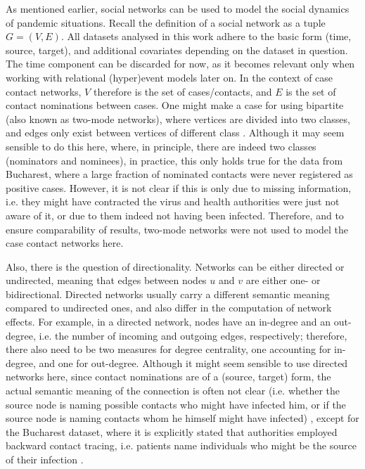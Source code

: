 As mentioned earlier, social networks can be used to model the social dynamics of pandemic situations. Recall the definition of a social network as a tuple $G = (V,E)$. All datasets analysed in this work adhere to the basic form (time, source, target), and additional covariates depending on the dataset in question. The time component can be discarded for now, as it becomes relevant only when working with relational (hyper)event models later on. In the context of case contact networks, $V$ therefore is the set of cases/contacts, and $E$ is the set of contact nominations between cases. One might make a case for using bipartite (also known as two-mode networks), where vertices are divided into two classes, and edges only exist between vertices of different class \cite{borgatti1997network,latapy2008basic}. Although it may seem sensible to do this here, where, in principle, there are indeed two classes (nominators and nominees), in practice, this only holds true for the data from Bucharest, where a large fraction of nominated contacts were never registered as positive cases. However, it is not clear if this is only due to missing information, i.e. they might have contracted the virus and health authorities were just not aware of it, or due to them indeed not having been infected. Therefore, and to ensure comparability of results, two-mode networks were not used to model the case contact networks here. 

Also, there is the question of directionality. Networks can be either directed or undirected, meaning that edges between nodes $u$ and $v$ are either one- or bidirectional. Directed networks usually carry a different semantic meaning compared to undirected ones, and also differ in the computation of network effects. For example, in a directed network, nodes have an in-degree and an out-degree, i.e. the number of incoming and outgoing edges, respectively; therefore, there also need to be two measures for degree centrality, one accounting for in-degree, and one for out-degree. Although it might seem sensible to use directed networks here, since contact nominations are of a (source, target) form, the actual semantic meaning of the connection is often not clear (i.e. whether the source node is naming possible contacts who might have infected him, or if the source node is naming contacts whom he himself might have infected) \cite{kojaku2021effectiveness}, except for the Bucharest dataset, where it is explicitly stated that authorities employed backward contact tracing, i.e. patients name individuals who might be the source of their infection \cite{hancean2021role}.

